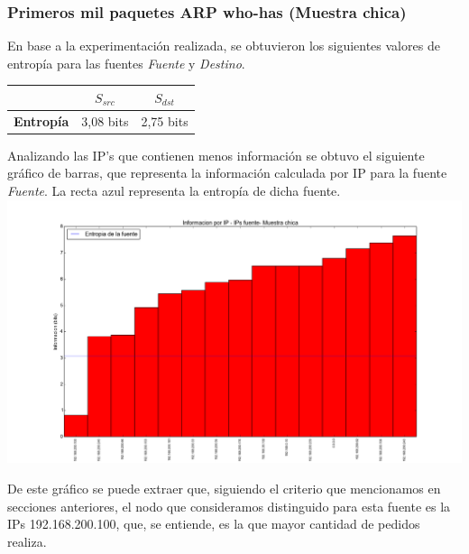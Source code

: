 \subsubsection{Primeros mil paquetes ARP who-has (Muestra chica)}

\indent En base a la experimentación realizada, se obtuvieron los siguientes valores de entropía para las fuentes \textit{Fuente} y \textit{Destino}.\\

\begin{center}
	\begin{tabular}{ | c | c | c |} \hline
	   & \textbf{$S_{src}$} & \textbf{$S_{dst}$} \\ \hline
	  	\textbf{Entropía} & 3,08 bits & 2,75 bits\\ \hline
	\end{tabular}
\end{center}

\indent \indent Analizando las IP's que contienen menos información se obtuvo el siguiente gráfico de barras, que representa la información calculada por IP para la fuente \textit{Fuente}. La recta azul representa la entropía de dicha fuente.\\


\includegraphics[scale=0.5,clip=true,trim=100 0 0 0]{graphics/laburo_chica_src.png}

\indent De este gráfico se puede extraer que, siguiendo el criterio que mencionamos en secciones anteriores, el nodo que consideramos distinguido para esta fuente es la IPs 192.168.200.100, que, se entiende, es la que mayor cantidad de pedidos realiza.


